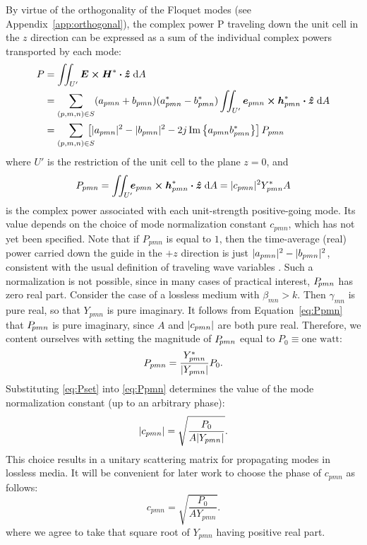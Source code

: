 By virtue of the orthogonality of the Floquet modes (see
Appendix~\ref{app:orthogonal}), the 
complex power P traveling down the unit cell in the $z$ direction can
be expressed as a sum of the individual complex powers transported by each mode:
\begin{align}
  P &= \iint_{U'} \boldsymbol{E} \boldsymbol{\times} \boldsymbol{H}^* \boldsymbol{\cdot} \boldsymbol{\hat{z}} \; \text{d} A
  \nonumber \\
  &= \sum_{(p,m,n) \in S}
  (a_{pmn} + b_{pmn})(a_{pmn}^* - b_{pmn}^*) \iint_{U'}
  \boldsymbol{e}_{pmn} \boldsymbol{\times} \boldsymbol{h}_{pmn}^* \boldsymbol{\cdot} \boldsymbol{\hat{z}} \; \text{d} A \nonumber \\
  &= \sum_{(p,m,n) \in S} \mkern -16 mu
  \left[
    \lvert a_{pmn}\rvert^2 - \lvert b_{pmn}\rvert^2 - 2j\operatorname{Im}\left\{a_{pmn}b_{pmn}^*\right\}
  \right]
  P_{pmn}
\end{align}
where $U'$ is the restriction of the unit cell to the plane $z=0$,
and
\begin{equation}
  P_{pmn} = \iint_{U'} \mkern -8 mu
  \boldsymbol{e}_{pmn} \boldsymbol{\times} \boldsymbol{h}_{pmn}^* \boldsymbol{\cdot} \boldsymbol{\hat{z}} \; \text{d} A  
  = \lvert c_{pmn}\rvert^2
  Y_{pmn}^* A
\label{eq:Ppmn}
\end{equation}
is the complex power associated with each unit-strength positive-going
mode.  Its value depends on the choice of mode normalization constant
$c_{pmn}$, which has not yet been specified.  Note that if $P_{pmn}$
is equal to $1$, then the time-average (real) power carried down the
guide in the $+z$ direction is just $\lvert a_{pmn}\rvert^2 -
\lvert b_{pmn}\rvert^2$, consistent
with the usual definition of traveling wave variables \cite{bbse:69}.
Such a normalization is not possible, since in many cases
of practical interest, $P_{\mkern -4mu pmn}$ has zero real part.
Consider the case of a lossless medium
with $\beta_{mn} > k$.  Then $\gamma_{mn}$ is pure real, so that
$Y_{pmn}$ is pure imaginary.  It follows from Equation~\eqref{eq:Ppmn}
that $P_{\mkern -4mu pmn}$ is pure imaginary, since $A$ and $\lvert c_{pmn}\rvert$ are
both pure real.  Therefore, we content ourselves with setting the
magnitude of $P_{\mkern -4mu pmn}$ equal to $P_0 \equiv \text{one watt}$:
\begin{equation}
  P_{pmn} = \frac{Y_{pmn}^*}{\lvert Y_{pmn}\rvert} P_0.
  \label{eq:Pset}
\end{equation}
Substituting \eqref{eq:Pset} into \eqref{eq:Ppmn} determines the value
of the mode normalization constant (up to an arbitrary phase):
\begin{equation}
  \lvert c_{pmn}\rvert = \sqrt{\frac{P_0}{A \lvert Y_{pmn}\rvert}}.
\end{equation}
This choice results in a unitary scattering matrix for propagating
modes in lossless media.  It will be convenient for later work to
choose the phase of $c_{pmn}$ as follows:
\begin{equation}
  c_{pmn} = \sqrt{\frac{P_0}{A Y_{pmn}}}.
  \label{eq:modenormalization}
\end{equation}
where we agree to take that square root of $Y_{pmn}$ having positive
real part.

